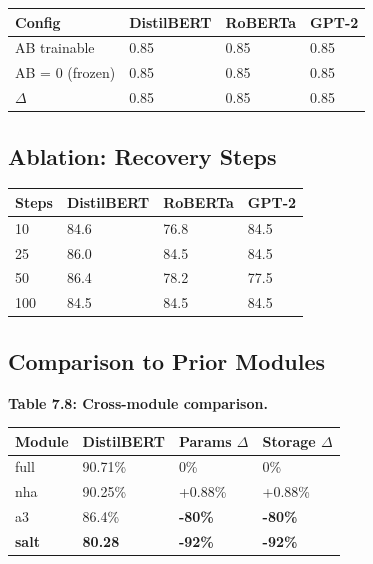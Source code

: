 \begin{table}[H]
\centering
\small
\begin{tabular}{llll}
\toprule
\textbf{Config} & \textbf{DistilBERT} & \textbf{RoBERTa} & \textbf{GPT-2} \\
\midrule
AB trainable & 0.85 & 0.85 & 0.85 \\
AB = 0 (frozen) & 0.85 & 0.85 & 0.85 \\
$\Delta$ & 0.85 & 0.85 & 0.85 \\
\bottomrule
\end{tabular}
\end{table}

\subsection{Ablation: Recovery Steps}

\begin{table}[H]
\centering
\small
\begin{tabular}{llll}
\toprule
\textbf{Steps} & \textbf{DistilBERT} & \textbf{RoBERTa} & \textbf{GPT-2} \\
\midrule
10 & 84.6 & 76.8 & 84.5 \\
25 & 86.0 & 84.5 & 84.5 \\
50 & 86.4 & 78.2 & 77.5 \\
100 & 84.5 & 84.5 & 84.5 \\
\bottomrule
\end{tabular}
\end{table}

\subsection{Comparison to Prior Modules}

\textbf{Table 7.8: Cross-module comparison.}

\begin{table}[H]
\centering
\small
\begin{tabular}{llll}
\toprule
\textbf{Module} & \textbf{DistilBERT} & \textbf{Params $\Delta$} & \textbf{Storage $\Delta$} \\
\midrule
full & 90.71\% & 0\% & 0\% \\
nha & 90.25\% & +0.88\% & +0.88\% \\
a3 & 86.4\% & \textbf{-80\%} & \textbf{-80\%} \\
\textbf{salt} & \textbf{80.28} & \textbf{-92\%} & \textbf{-92\%} \\
\bottomrule
\end{tabular}
\end{table}

